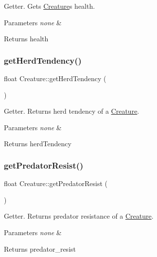 Getter. Gets \hyperlink{class_creature}{Creature}\textquotesingle{}s health. 
\begin{DoxyParams}{Parameters}
{\em none} & \\
\hline
\end{DoxyParams}
\begin{DoxyReturn}{Returns}
health 
\end{DoxyReturn}
\mbox{\label{class_creature_a1683c23a3644294d16529feb3d10e2c3}} 
\subsubsection{\texorpdfstring{get\+Herd\+Tendency()}{getHerdTendency()}}
{\footnotesize\ttfamily float Creature\+::get\+Herd\+Tendency (\begin{DoxyParamCaption}{ }\end{DoxyParamCaption})}

Getter. Returns herd tendency of a \hyperlink{class_creature}{Creature}. 
\begin{DoxyParams}{Parameters}
{\em none} & \\
\hline
\end{DoxyParams}
\begin{DoxyReturn}{Returns}
herd\+Tendency 
\end{DoxyReturn}
\mbox{\label{class_creature_af18fa6015052120359c99cd56620c91e}} 
\subsubsection{\texorpdfstring{get\+Predator\+Resist()}{getPredatorResist()}}
{\footnotesize\ttfamily float Creature\+::get\+Predator\+Resist (\begin{DoxyParamCaption}{ }\end{DoxyParamCaption})}

Getter. Returns predator resistance of a \hyperlink{class_creature}{Creature}. 
\begin{DoxyParams}{Parameters}
{\em none} & \\
\hline
\end{DoxyParams}
\begin{DoxyReturn}{Returns}
predator\+\_\+resist 
\end{DoxyReturn}
\mbox{\label{class_creature_a29c472b8d8c500ed750028d35008b874}} 

